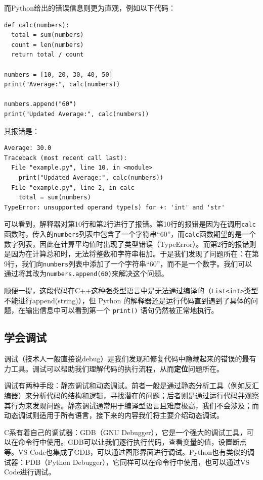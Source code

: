 \documentclass[../main.tex]{subfiles}
\begin{document}
而Python给出的错误信息则更为直观，例如以下代码：

\begin{verbatim}
def calc(numbers):
  total = sum(numbers)
  count = len(numbers)
  return total / count

numbers = [10, 20, 30, 40, 50]
print("Average:", calc(numbers))

numbers.append("60")
print("Updated Average:", calc(numbers))
\end{verbatim}

其报错是：
\begin{verbatim}
Average: 30.0
Traceback (most recent call last):
  File "example.py", line 10, in <module>
    print("Updated Average:", calc(numbers))
  File "example.py", line 2, in calc
    total = sum(numbers)
TypeError: unsupported operand type(s) for +: 'int' and 'str'
\end{verbatim}

可以看到，解释器对第10行和第2行进行了报错。第10行的报错是因为在调用\texttt{calc}函数时，传入的\texttt{numbers}列表中包含了一个字符串“60”，而\texttt{calc}函数期望的是一个数字列表，因此在计算平均值时出现了类型错误（TypeError）。而第2行的报错则是因为在计算总和时，无法将整数和字符串相加。于是我们发现了问题所在：在第9行，我们向\texttt{numbers}列表中添加了一个字符串“60”，而不是一个数字。我们可以通过将其改为\texttt{numbers.append(60)}来解决这个问题。

顺便一提，这段代码在C++这种强类型语言中是无法通过编译的（\texttt{List<int>}类型不能进行append(string)），但 Python 的解释器还是运行代码直到遇到了具体的问题，在输出信息中可以看到第一个 \texttt{print()} 语句仍然被正常地执行。

\subsection{学会调试}

调试（技术人一般直接说debug）是我们发现和修复代码中隐藏起来的错误的最有力工具。调试可以帮助我们理解代码的执行流程，从而\textbf{定位}问题所在。

调试有两种手段：静态调试和动态调试。前者一般是通过静态分析工具（例如反汇编器）来分析代码的结构和逻辑，寻找潜在的问题；后者则是通过运行代码并观察其行为来发现问题。静态调试通常用于编译型语言且难度极高，我们不会涉及；而动态调试则适用于所有语言，接下来的内容我们将主要介绍动态调试。

C系有着自己的调试器：GDB（GNU Debugger），它是一个强大的调试工具，可以在命令行中使用。GDB可以让我们逐行执行代码，查看变量的值，设置断点等。VS Code也集成了GDB，可以通过图形界面进行调试。Python也有类似的调试器：PDB（Python Debugger），它同样可以在命令行中使用，也可以通过VS Code进行调试。
\end{document}

